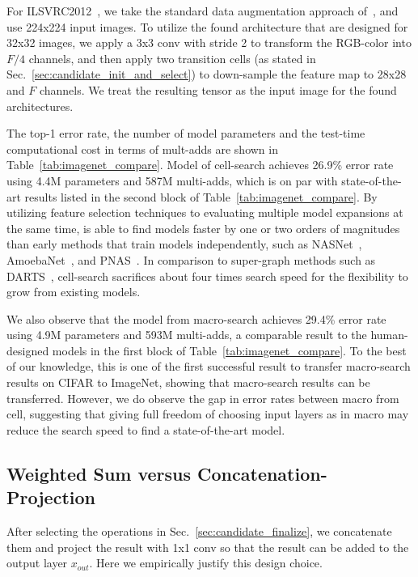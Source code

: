 For ILSVRC2012~\citep{ILSVRC15}, we take the standard data augmentation approach of~\citep{resnet}, and use 224x224 input images. To utilize the found architecture that are designed for 32x32 images, we apply a 3x3 conv with stride 2 to transform the RGB-color into $F / 4$ channels, and then apply two transition cells (as stated in Sec.~\ref{sec:candidate_init_and_select}) to down-sample the feature map to 28x28 and $F$ channels. We treat the resulting tensor as the input image for the found architectures. 

The top-1 error rate, the number of model parameters and the test-time computational cost in terms of mult-adds are shown in Table~\ref{tab:imagenet_compare}. Model of \Petridish cell-search achieves 26.9\% error rate using 4.4M parameters and 587M multi-adds, which is on par with state-of-the-art results listed in the second block of Table~\ref{tab:imagenet_compare}. By utilizing feature selection techniques to evaluating multiple model expansions at the same time, \Petridish is able to find models faster by one or two orders of magnitudes than early methods that train models independently, such as NASNet~\citep{NASCell}, AmoebaNet~\citep{Real2018RegularizedEF}, and PNAS~\citep{Liu2017ProgressiveNA}.  
In comparison to super-graph methods such as DARTS~\citep{Liu2018DARTSDA}, \Petridish cell-search sacrifices about four times search speed for the flexibility to grow from existing models. 

We also observe that the model from \Petridish macro-search achieves 29.4\% error rate using 4.9M parameters and 593M multi-adds, a comparable result to the human-designed models in the first block of Table~\ref{tab:imagenet_compare}. To the best of our knowledge, this is one of the first successful result to transfer macro-search results on CIFAR to ImageNet, showing that macro-search results can be transferred. 
However, we do observe the gap in error rates between \Petridish macro from \Petridish cell, suggesting that giving full freedom of choosing input layers as in \Petridish macro may reduce the search speed to find a state-of-the-art model.


\subsection{Weighted Sum versus Concatenation-Projection}
\label{sec:sum_vs_cat_proj}

After selecting the operations in Sec.~\ref{sec:candidate_finalize}, we concatenate them and project the result with 1x1 conv so that the result can be added to the output layer $x_{out}$. 
Here we empirically justify this design choice.

